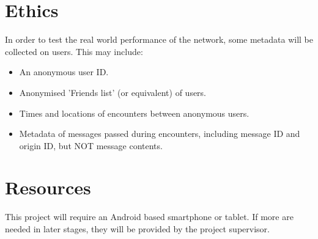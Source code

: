 \documentclass{article}
\begin{document}
\section*{Ethics}
In order to test the real world performance of the network, some metadata will be collected on users. This may include:
\begin{itemize}
\item An anonymous user ID.
\item Anonymised 'Friends list' (or equivalent) of users.
\item Times and locations of encounters between anonymous users.
\item Metadata of messages passed during encounters, including message ID and origin ID, but NOT message contents.
\end{itemize}

\section*{Resources}
This project will require an Android based smartphone or tablet. If more are needed in later stages, they will be provided by the project supervisor.
\end{document}
